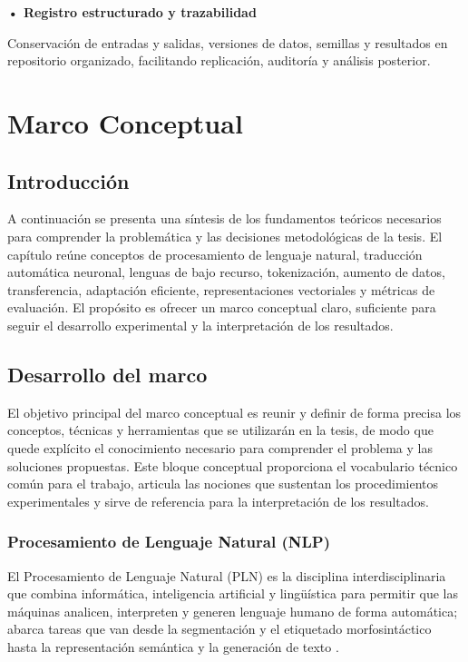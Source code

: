 \documentclass[12pt,a4paper,oneside]{book}
\begin{document}
\textbf{• Registro estructurado y trazabilidad}

Conservación de entradas y salidas, versiones de datos, semillas y resultados en repositorio organizado, facilitando replicación, auditoría y análisis posterior.

\chapter{Marco Conceptual}\label{marco-conceptual}

\section{Introducción}\label{introducciuxf3n}

A continuación se presenta una síntesis de los fundamentos teóricos necesarios para comprender la problemática y las decisiones metodológicas de la tesis. El capítulo reúne conceptos de procesamiento de lenguaje natural, traducción automática neuronal, lenguas de bajo recurso, tokenización, aumento de datos, transferencia, adaptación eficiente, representaciones vectoriales y métricas de evaluación. El propósito es ofrecer un marco conceptual claro, suficiente para seguir el desarrollo experimental y la interpretación de los resultados.

\section{Desarrollo del marco}\label{desarrollo-del-marco}

El objetivo principal del marco conceptual es reunir y definir de forma precisa los conceptos, técnicas y herramientas que se utilizarán en la tesis, de modo que quede explícito el conocimiento necesario para comprender el problema y las soluciones propuestas. Este bloque conceptual proporciona el vocabulario técnico común para el trabajo, articula las nociones que sustentan los procedimientos experimentales y sirve de referencia para la interpretación de los resultados.

\subsection{Procesamiento de Lenguaje Natural (NLP)}\label{procesamiento-de-lenguaje-natural-nlp}

El Procesamiento de Lenguaje Natural (PLN) es la disciplina interdisciplinaria que combina informática, inteligencia artificial y lingüística para permitir que las máquinas analicen, interpreten y generen lenguaje humano de forma automática; abarca tareas que van desde la segmentación y el etiquetado morfosintáctico hasta la representación semántica y la generación de texto \parencite{chowdhury2003}.
\end{document}

